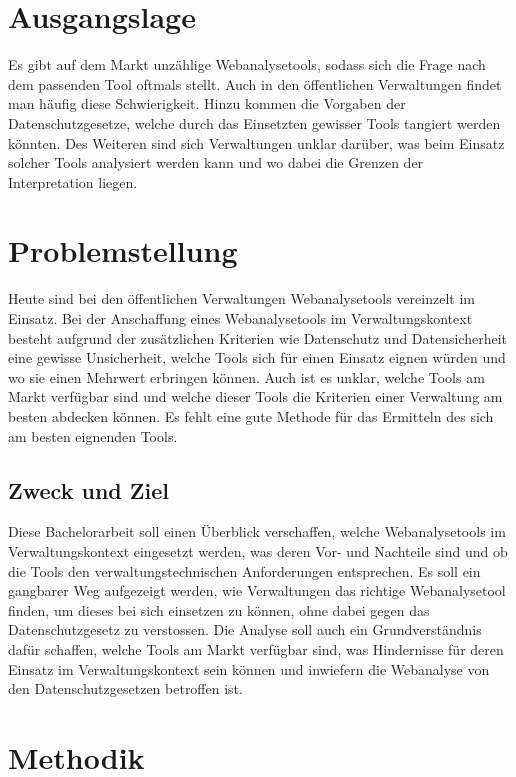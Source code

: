 
\section{Ausgangslage}
Es gibt auf dem Markt unzählige Webanalysetools, sodass sich die Frage nach dem passenden Tool oftmals stellt. Auch in den öffentlichen Verwaltungen findet man häufig diese Schwierigkeit. Hinzu kommen die Vorgaben der Datenschutzgesetze, welche durch das Einsetzten gewisser Tools tangiert werden könnten. Des Weiteren sind sich Verwaltungen unklar darüber, was beim Einsatz solcher Tools analysiert werden kann und wo dabei die Grenzen der Interpretation liegen.

\section{Problemstellung}

Heute sind bei den öffentlichen Verwaltungen Webanalysetools vereinzelt im Einsatz. Bei der Anschaffung eines Webanalysetools im Verwaltungskontext besteht aufgrund der zusätzlichen Kriterien wie Datenschutz und Datensicherheit eine gewisse Unsicherheit, welche Tools sich für einen Einsatz eignen würden und wo sie einen Mehrwert erbringen können. Auch ist es unklar, welche Tools am Markt verfügbar sind und welche dieser Tools die Kriterien einer Verwaltung am besten abdecken können. Es fehlt eine gute Methode für das Ermitteln des sich am besten eignenden Tools.

\subsection{Zweck und Ziel}
Diese Bachelorarbeit soll einen Überblick verschaffen, welche Webanalysetools im Verwaltungskontext eingesetzt werden, was deren Vor- und Nachteile sind und ob die Tools den verwaltungstechnischen Anforderungen entsprechen. Es soll ein gangbarer Weg aufgezeigt werden, wie Verwaltungen das richtige Webanalysetool finden, um dieses bei sich einsetzen zu können, ohne dabei gegen das Datenschutzgesetz zu verstossen. Die Analyse soll auch ein Grundverständnis dafür schaffen, welche Tools am Markt verfügbar sind, was Hindernisse für deren Einsatz im Verwaltungskontext sein können und inwiefern die Webanalyse von den Datenschutzgesetzen betroffen ist.


\section{Methodik}


